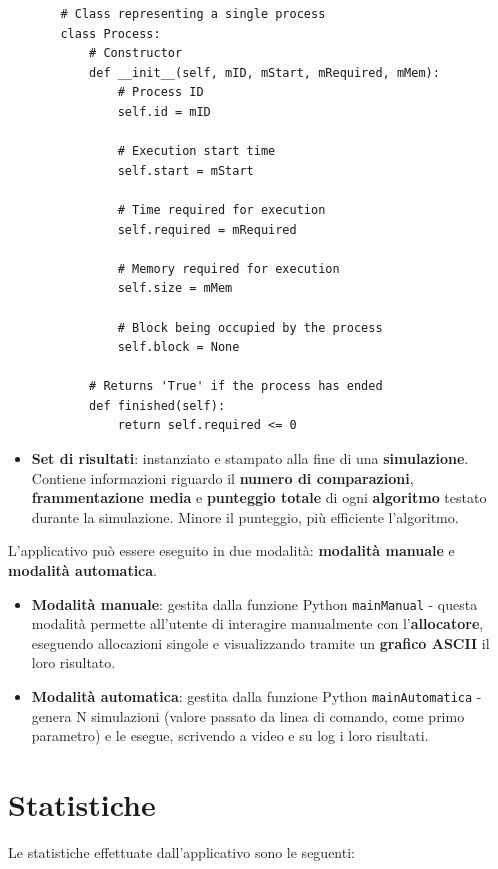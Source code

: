 \documentclass[12pt]{report}
\renewcommand\emph{\textbf}
\begin{document}
\begin{itemize}
            \begin{verbatim}
    # Class representing a single process
    class Process:
        # Constructor
        def __init__(self, mID, mStart, mRequired, mMem):
            # Process ID
            self.id = mID

            # Execution start time
            self.start = mStart

            # Time required for execution
            self.required = mRequired

            # Memory required for execution
            self.size = mMem

            # Block being occupied by the process
            self.block = None

        # Returns 'True' if the process has ended
        def finished(self):
            return self.required <= 0
            \end{verbatim}

            \item \emph{Set di risultati}: instanziato e stampato alla fine di una \emph{simulazione}. Contiene informazioni riguardo il \emph{numero di comparazioni}, \emph{frammentazione media} e \emph{punteggio totale} di ogni \emph{algoritmo} testato durante la simulazione. Minore il punteggio, più efficiente l'algoritmo.
        \end{itemize}

        L'applicativo può essere eseguito in due modalità: \emph{modalità manuale} e \emph{modalità automatica}.

        \begin{itemize}
            \item \emph{Modalità manuale}: gestita dalla funzione Python \texttt{mainManual} - questa modalità permette all'utente di interagire manualmente con l'\emph{allocatore}, eseguendo allocazioni singole e visualizzando tramite un \emph{grafico ASCII} il loro risultato.

            \item \emph{Modalità automatica}: gestita dalla funzione Python \texttt{mainAutomatica} - genera N simulazioni (valore passato da linea di comando, come primo parametro) e le esegue, scrivendo a video e su log i loro risultati. 
        \end{itemize}

    \section{Statistiche}
        Le statistiche effettuate dall'applicativo sono le seguenti:
\end{document}
